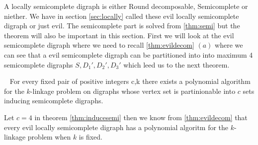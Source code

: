A locally semicomplete digraph is either Round decomposable, Semicomplete or niether.
We have in section \autoref{sec:locally} called these evil locally semicomplete digraph or just evil.
The semicomplete part is solved from \autoref{thm:semi} but the theorem will also be important in this section.
First we will look at the evil semicomplete digraph where we need to recall \autoref{thm:evildecom} $(a)$ where we can see that a evil semicomplete digraph can be partitioned into into maximum 4 semicomplete digraphs $S,D_1',D_2',D_3'$ which leed us to the next theorem.
\begin{thm}~\cite{bangJGT85}
    For every fixed pair of positive integers c,k there exists a polynomial algorithm for the $k$-linkage problem on digraphs whose vertex set is partinionable into $c$ sets inducing semicomplete digraphs.
    \label{thm:inducesemi}
\end{thm}
Let $c=4$ in theorem \autoref{thm:inducesemi} then we know from \autoref{thm:evildecom} that every evil locally semicomplete digraph has a polynomial algoritm for the $k$-linkage problem when $k$ is fixed.\\

